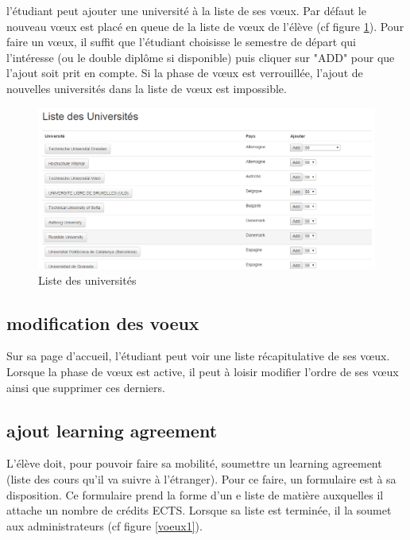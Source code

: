 l'étudiant peut ajouter une université à la liste de ses vœux. Par défaut le nouveau vœux est placé en queue de la liste de vœux de l'élève (cf figure \ref{lus}). Pour faire un vœux, il suffit que l'étudiant choisisse le semestre de départ qui l'intéresse (ou le double diplôme si disponible) puis cliquer sur "ADD" pour que l'ajout soit prit en compte. 
\smallbreak
Si la phase de vœux est verrouillée, l'ajout de nouvelles universités dans la liste de vœux est impossible.

\begin{figure}[H]
	\centering
	\includegraphics[scale=0.35]{images/LUS.png}
	\caption{Liste des universités}
	\label{lus}
\end{figure}

\subsection{modification des voeux}

Sur sa page d'accueil, l'étudiant peut voir une liste récapitulative de ses vœux. Lorsque la phase de vœux est active, il peut à loisir modifier l'ordre de ses vœux ainsi que supprimer ces derniers.

\subsection{ajout learning agreement}

L'élève doit, pour pouvoir faire sa mobilité, soumettre un learning agreement (liste des cours qu'il va suivre à l'étranger). Pour ce faire, un formulaire est à sa disposition. Ce formulaire prend la forme d'un e liste de matière auxquelles il attache un nombre de crédits ECTS. Lorsque sa liste est terminée, il la soumet aux administrateurs (cf figure \ref{voeux1}).

